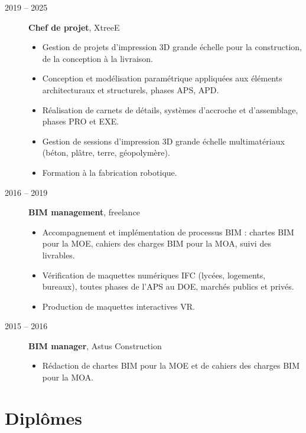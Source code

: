 \documentclass[11pt,a4paper]{article}
\begin{document}
\begin{description}
  \item[2019 -- 2025] \textbf{Chef de projet}, XtreeE
  \begin{itemize}
    \item Gestion de projets d'impression 3D grande échelle pour la construction, de la conception à la livraison.
    \item Conception et modélisation paramétrique appliquées aux éléments architecturaux et structurels, phases APS, APD.
    \item Réalisation de carnets de détails, systèmes d'accroche et d'assemblage, phases PRO et EXE.
    \item Gestion de sessions d'impression 3D grande échelle multimatériaux (béton, plâtre, terre, géopolymère).
    \item Formation à la fabrication robotique.
  \end{itemize}

  \item[2016 -- 2019] \textbf{BIM management}, freelance
  \begin{itemize}
    \item Accompagnement et implémentation de processus BIM : chartes BIM pour la MOE, cahiers des charges BIM pour la MOA, suivi des livrables.
    \item Vérification de maquettes numériques IFC (lycées, logements, bureaux), toutes phases de l'APS au DOE, marchés publics et privés.
    \item Production de maquettes interactives VR.
  \end{itemize}

  \item[2015 -- 2016] \textbf{BIM manager}, Astus Construction
  \begin{itemize}
    \item Rédaction de chartes BIM pour la MOE et de cahiers des charges BIM pour la MOA.
  \end{itemize}
\end{description}

\section*{Diplômes}
\end{document}

